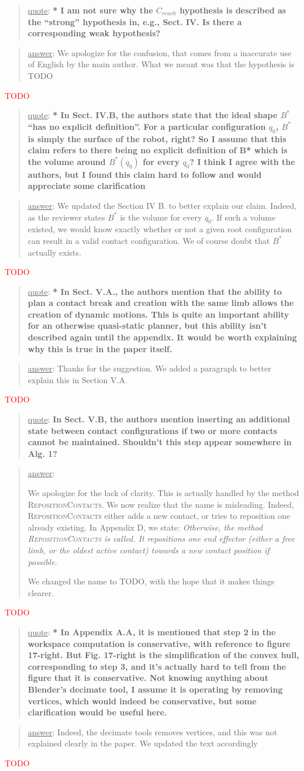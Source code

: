 \documentclass[a4paper]{article}
\newcommand{\ndone}[0]{\textcolor{red}{TODO}}
\newcommand\quot[1]{\begin{quote} \underline{quote}: \textbf{#1}\end{quote}}
\newcommand\as[1]{\begin{quote} \underline{answer}: {#1}\end{quote} }
\begin{document}
\quot{* I am not sure why the $C_{reach}$ hypothesis is described as the ``strong''
hypothesis in, e.g., Sect. IV. Is there a corresponding weak
hypothesis?}
\as{We apologize for the confusion, that comes from a inaccurate use of English by the main author. What we meant was that the hypothesis is TODO}\ndone

\quot{* In Sect. IV.B, the authors state that the ideal shape $B^*$ ``has no
explicit definition''. For a particular configuration  $q_0$, $B^*$ is simply
the surface of the robot, right? So I assume that this claim refers to
there being no explicit definition of B* which is the volume around
$B^*(q_0)$ for every $q_0$? I think I agree with the authors, but I found
this claim hard to follow and would appreciate some clarification}
\as{We updated the Section IV B. to better explain our claim. Indeed, as the reviewer states $B^*$  is the volume for every $q_0$. If such a volume existed, we would know exactly whether or not a given root configuration can result in a valid contact configuration.
We of course doubt that $B^*$ actually exists. }\ndone

\quot{* In Sect. V.A., the authors mention that the ability to plan a contact
break and creation with the same limb allows the creation of dynamic
motions. This is quite an important ability for an otherwise
quasi-static planner, but this ability isn't described again until the
appendix. It would be worth explaining why this is true in the paper
itself. }
\as{Thanks for the suggestion. We added a paragraph to better explain this in Section V.A.}\ndone

\quot{In Sect. V.B, the authors mention inserting an additional state
between contact configurations if two or more contacts cannot be
maintained. Shouldn't this step appear somewhere in Alg. 1?}
\as{We apologize for the lack of clarity. This is actually handled by the method \textsc{RepositionContacts}. We now realize that the name is misleading. Indeed,
\textsc{RepositionContacts} either adds a new contact, or tries to reposition one already existing. In Appendix D, we state:
\textit{Otherwise, the method \textsc{RepositionContacts} is called. It repositions one end effector (either a free
limb, or the oldest active contact) towards a new contact
position if possible. }

We changed the name to \textsc{TODO}, with the hope that it makes things clearer.}\ndone

\quot{* In Appendix A.A, it is mentioned that step 2 in the workspace
computation is conservative, with reference to figure 17-right. But
Fig. 17-right is the simplification of the convex hull, corresponding
to step 3, and it's actually hard to tell from the figure that it is
conservative. Not knowing anything about Blender's decimate tool, I
assume it is operating by removing vertices, which would indeed be
conservative, but some clarification would be useful here.}
\as{Indeed, the decimate tools removes vertices, and this was not explained clearly in the paper. We updated the text accordingly}\ndone
\end{document}
